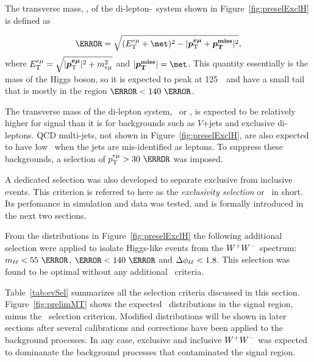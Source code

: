 \par The transverse mass, \mT, of the di-lepton-\met\ system shown in Figure~\ref{fig:preselExclH} 
is defined as  

\begin{equation}
  \label{eq:mT}
  \mT = \sqrt{(E_{\mathrm T}^{e\mu}+\met)^{2} - |\boldsymbol{\pTemu} + \boldsymbol{ p_{\mathrm T}^{\mathrm{miss}}}|^{2}},
\end{equation}
where $E_{\mathrm T}^{e\mu} = \sqrt{|\boldsymbol{p_{\textrm{T}}^{e\mu}}|^{2}+m_{e\mu}^{2}}$ and $|\boldsymbol{ p_{\mathrm T}^{\mathrm{miss}}}|=\met$. 
This quantity essentially is the mass of the Higgs boson, so it is expected to peak at 125~\GeV\ and have 
a small tail that is mostly in the region $\mT<140~\GeV$.

\par The transverse mass of the di-lepton system, \pTll\ or \pTemu, 
is expected to be relatively higher for signal than it is for backgrounds such as $V$+jets and 
exclusive di-leptons. QCD multi-jets, not shown in Figure~\ref{fig:preselExclH}, are also expected 
to have low \pTemu\ when the jets are mis-identified as leptons. To suppress these backgrounds, a selection 
of $\pTemu>30~\GeV$ was imposed.  

\par A dedicated selection was also developed to separate exclusive from inclusive events. This criterion 
is referred to here as the {\it exclusivity selection} or \DZ\ in short. Its perfomance in simulation and 
data was tested, and is formally introduced in the next two sections.   

\par From the distributions in Figure~\ref{fig:preselExclH} the following additional selection were applied to 
isolate Higgs-like events from the $W^+W^-$ spectrum: $\mll<55~\GeV$, $\mT<140~\GeV$ and $\Delta\phi_{\ell\ell}<1.8$. This selection 
was found to be optimal without any additional 
 \met\ criteria.  

\par Table~\ref{tab:evSel} summarizes all the selection criteria discussed in this section. 
Figure~\ref{fig:prelimMT} shows the expected \mT\ distributions in the signal region, minus 
the \mT\ selection criterion. Modified distributions will be shown in later sections after 
several calibrations and corrections have been applied to the background processes. In any case, exclusive 
and inclusive $W^+W^-$ was expected to dominanate the background processes that contaminated 
the signal region. 

